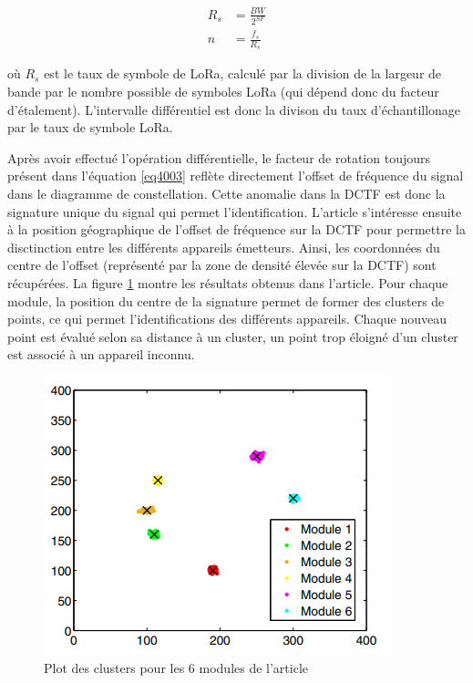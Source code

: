 \begin{align}\label{eq4006}
	R_s &= \frac{BW}{2^{SF}} \\
	n	&= \frac{f_s}{R_s}
\end{align}

où $R_s$ est le taux de symbole de \ac{LoRa}, calculé par la division de la largeur de bande par le nombre possible de symboles \ac{LoRa} (qui dépend donc du facteur d'étalement). L'intervalle différentiel est donc la divison du taux d'échantillonage par le taux de symbole \ac{LoRa}.

\vspace{0.1cm}

Après avoir effectué l'opération différentielle, le facteur de rotation toujours présent dans l'équation \ref{eq4003} reflète directement l'offset de fréquence du signal dans le diagramme de constellation. Cette anomalie dans la \ac{DCTF} est donc la signature unique du signal qui permet l'identification. L'article s'intéresse ensuite à la position géographique de l'offset de fréquence sur la \ac{DCTF} pour permettre la disctinction entre les différents appareils émetteurs. Ainsi, les coordonnées du centre de l'offset (représenté par la zone de densité élevée sur la \ac{DCTF}) sont récupérées. La figure \ref{term4000} montre les résultats obtenus dans l'article. Pour chaque module, la position du centre de la signature permet de former des clusters de points, ce qui permet l'identifications des différents appareils. Chaque nouveau point est évalué selon sa distance à un cluster, un point trop éloigné d'un cluster est associé à un appareil inconnu.


\begin{figure}[h]
\centering

\includegraphics[scale=0.8]{images/impossible.png}
\caption{Plot des clusters pour les 6 modules de l'article\cite{loraDCTF}}\label{term4000}
\end{figure}

